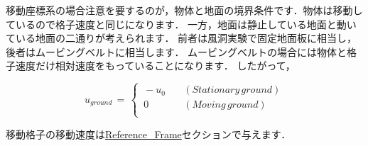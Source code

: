 移動座標系の場合注意を要するのが，物体と地面の境界条件です．物体は移動しているので格子速度と同じになります．
一方，地面は静止している地面と動いている地面の二通りが考えられます．
前者は風洞実験で固定地面板に相当し，後者はムービングベルトに相当します．
ムービングベルトの場合には物体と格子速度だけ相対速度をもっていることになります．
したがって，

\begin{equation}
u_{ground}\,=\,
\begin{cases}
\, -u_{0} & \quad (Stationary\,ground)\\
\, 0 & \quad (Moving\,ground)\\
\end{cases}
\label{eq:relative velocity wall}
\end{equation}

移動格子の移動速度は\hyperlink{tgt:reference_frame}{Reference\_Frame}セクションで与えます．






